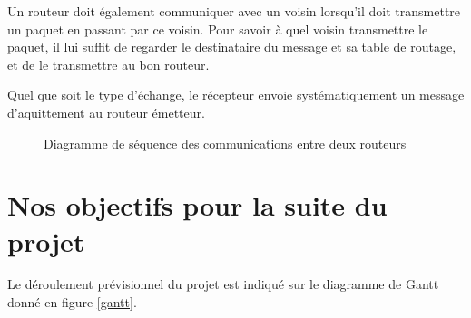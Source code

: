 \documentclass[a4paper,11pt]{article}
\begin{document}
Un routeur doit également communiquer avec un voisin lorsqu'il doit transmettre un paquet en passant par ce voisin. Pour savoir à quel voisin transmettre le paquet, il lui suffit de regarder le destinataire du message et sa table de routage, et de le transmettre au bon routeur.

Quel que soit le type d'échange, le récepteur envoie systématiquement un message d'aquittement au routeur émetteur.

\begin{figure}[H]
\begin{center}
\caption{Diagramme de séquence des communications entre deux routeurs}
\end{center}
\end{figure}

\section{Nos objectifs pour la suite du projet}

Le déroulement prévisionnel du projet est indiqué sur le diagramme de Gantt donné en figure \ref{gantt}.

\vspace{20pt}
\end{document}
